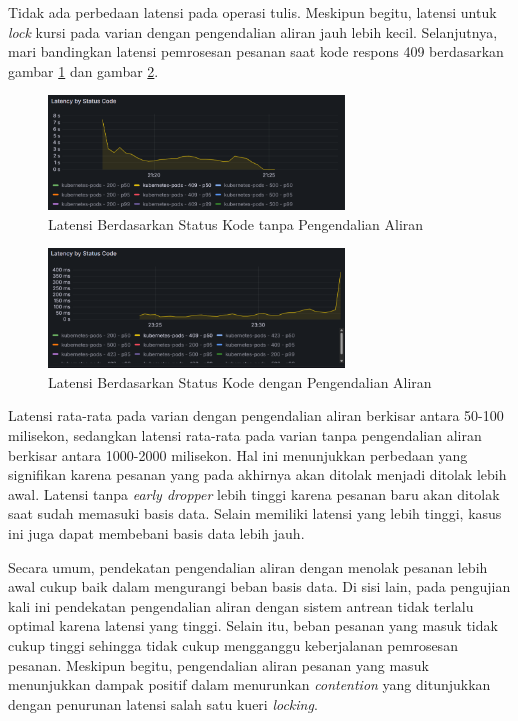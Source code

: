 Tidak ada perbedaan latensi pada operasi tulis. Meskipun begitu, latensi untuk \textit{lock} kursi pada varian dengan pengendalian aliran jauh lebih kecil. Selanjutnya, mari bandingkan latensi pemrosesan pesanan saat kode respons 409 berdasarkan gambar \ref{fig:latency-by-code-nofc} dan gambar \ref{fig:latency-by-code-fc}.

\begin{figure}[htbp]
    \centering
    \includegraphics[width=0.7\textwidth]{resources/chapter-4/latency-by-code-nofc-pg-stress-0.png}
    \caption{Latensi Berdasarkan Status Kode tanpa Pengendalian Aliran}
    \label{fig:latency-by-code-nofc}
\end{figure}

\begin{figure}[htbp]
    \centering
    \includegraphics[width=0.7\textwidth]{resources/chapter-4/latency-by-code-fc-pg-stress-0.png}
    \caption{Latensi Berdasarkan Status Kode dengan Pengendalian Aliran}
    \label{fig:latency-by-code-fc}
\end{figure}

Latensi rata-rata pada varian dengan pengendalian aliran berkisar antara 50-100 milisekon, sedangkan latensi rata-rata pada varian tanpa pengendalian aliran berkisar antara 1000-2000 milisekon. Hal ini menunjukkan perbedaan yang signifikan karena pesanan yang pada akhirnya akan ditolak menjadi ditolak lebih awal. Latensi tanpa \textit{early dropper} lebih tinggi karena pesanan baru akan ditolak saat sudah memasuki basis data. Selain memiliki latensi yang lebih tinggi, kasus ini juga dapat membebani basis data lebih jauh.

Secara umum, pendekatan pengendalian aliran dengan menolak pesanan lebih awal cukup baik dalam mengurangi beban basis data. Di sisi lain, pada pengujian kali ini pendekatan pengendalian aliran dengan sistem antrean tidak terlalu optimal karena latensi yang tinggi. Selain itu, beban pesanan yang masuk tidak cukup tinggi sehingga tidak cukup mengganggu keberjalanan pemrosesan pesanan. Meskipun begitu, pengendalian aliran pesanan yang masuk menunjukkan dampak positif dalam menurunkan \textit{contention} yang ditunjukkan dengan penurunan latensi salah satu kueri \textit{locking}.

